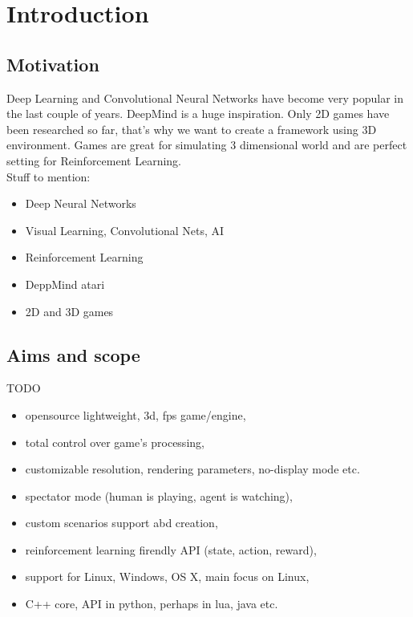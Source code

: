 
\chapter{Introduction}

\section{Motivation}
Deep Learning and Convolutional Neural Networks have become very popular in the last couple of years. DeepMind is a huge inspiration. Only 2D games have been researched so far, that's why we want to create a framework using 3D environment. Games are great for simulating 3 dimensional world and are perfect setting for Reinforcement Learning.\\
Stuff to mention:
\begin{itemize}
	\item Deep Neural Networks
	\item Visual Learning, Convolutional Nets, AI
	\item Reinforcement Learning
	\item DeppMind atari
	\item 2D and 3D games
\end{itemize}

\section{Aims and scope}
TODO
\begin{itemize}
	\item opensource lightweight, 3d, fps game/engine,
	\item total control over game's processing,
	\item customizable resolution, rendering parameters, no-display mode etc.
	\item spectator mode (human is playing, agent is watching),
	\item custom scenarios support abd creation,
	\item reinforcement learning firendly API (state, action, reward),
	\item support for Linux, Windows, OS X, main focus on Linux,
	\item C++ core, API in python, perhaps in lua, java etc.
\end{itemize}
	

